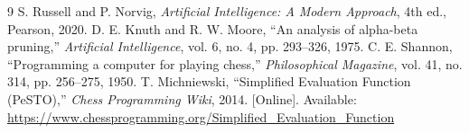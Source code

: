 \documentclass[11pt,a4paper]{article}
\begin{document}
\begin{thebibliography}{9}
S. Russell and P. Norvig, \textit{Artificial Intelligence: A Modern Approach}, 4th ed., Pearson, 2020.
D. E. Knuth and R. W. Moore, ``An analysis of alpha-beta pruning,'' \textit{Artificial Intelligence}, vol. 6, no. 4, pp. 293--326, 1975.
C. E. Shannon, ``Programming a computer for playing chess,'' \textit{Philosophical Magazine}, vol. 41, no. 314, pp. 256--275, 1950.
T. Michniewski, ``Simplified Evaluation Function (PeSTO),'' \textit{Chess Programming Wiki}, 2014. [Online]. Available: \url{https://www.chessprogramming.org/Simplified_Evaluation_Function}
\end{thebibliography}
\end{document}
